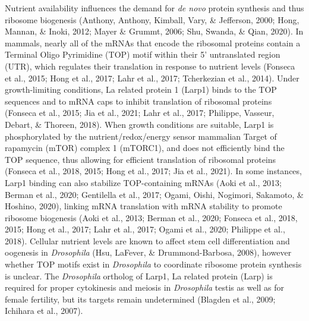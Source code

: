 \documentclass[12pt,twoside]{reedthesis}
\begin{document}
Nutrient availability influences the demand for \emph{de novo} protein
synthesis and thus ribosome biogenesis
(Anthony, Anthony, Kimball, Vary, \& Jefferson, 2000; Hong, Mannan, \& Inoki, 2012; Mayer \& Grummt, 2006; Shu, Swanda, \& Qian, 2020). In mammals, nearly all of the mRNAs that
encode the ribosomal proteins contain a Terminal Oligo Pyrimidine (TOP)
motif within their 5' untranslated region (UTR), which regulates their
translation in response to nutrient levels (Fonseca et al., 2015; Hong et al., 2017; Lahr et al., 2017; Tcherkezian et al., 2014). Under growth-limiting
conditions, La related protein 1 (Larp1) binds to the TOP sequences and
to mRNA caps to inhibit translation of ribosomal proteins
(Fonseca et al., 2015; Jia et al., 2021; Lahr et al., 2017; Philippe, Vasseur, Debart, \& Thoreen, 2018). When growth conditions are
suitable, Larp1 is phosphorylated by the nutrient/redox/energy sensor
mammalian Target of rapamycin (mTOR) complex 1 (mTORC1), and does not
efficiently bind the TOP sequence, thus allowing for efficient
translation of ribosomal proteins (Fonseca et al., 2018, 2015; Hong et al., 2017; Jia et al., 2021). In some instances, Larp1 binding can also
stabilize TOP-containing mRNAs (Aoki et al., 2013; Berman et al., 2020; Gentilella et al., 2017; Ogami, Oishi, Nogimori, Sakamoto, \& Hoshino, 2020), linking mRNA translation
with mRNA stability to promote ribosome biogenesis
(Aoki et al., 2013; Berman et al., 2020; Fonseca et al., 2018, 2015; Hong et al., 2017; Lahr et al., 2017; Ogami et al., 2020; Philippe et al., 2018). Cellular nutrient levels are
known to affect stem cell differentiation and oogenesis in \emph{Drosophila}
(Hsu, LaFever, \& Drummond-Barbosa, 2008), however whether TOP motifs exist in
\emph{Drosophila} to coordinate ribosome protein synthesis is unclear. The
\emph{Drosophila} ortholog of Larp1, La related protein (Larp) is required
for proper cytokinesis and meiosis in \emph{Drosophila} testis as well as for
female fertility, but its targets remain undetermined (Blagden et al., 2009; Ichihara et al., 2007).
\end{document}
